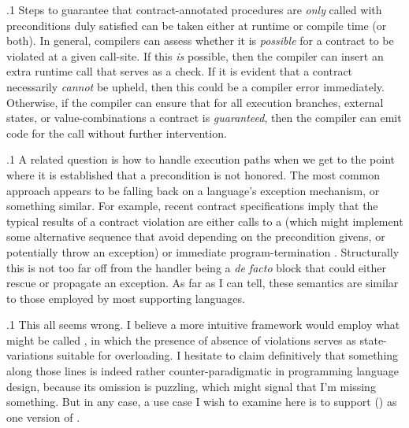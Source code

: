 \documentclass[11pt, twocolumn]{article}
\begin{document}
\p.1{%
Steps to guarantee that contract-annotated procedures
are \textit{only} called with preconditions duly satisfied
can be taken either at runtime or compile time (or both).
In general, compilers can assess whether it is \textit{possible}
for a contract to be violated at a given call-site.
If this \textit{is} possible, then the compiler can insert
an extra runtime call that serves as a 
check. If it is evident that a contract necessarily
\textit{cannot} be upheld, then this could be a compiler
error immediately. Otherwise, if the compiler
can ensure that for all execution branches, external states,
or value-combinations a contract is \textit{guaranteed}, then
the compiler can emit code for the call without further
intervention.
}%

\p.1{%
A related question is how to handle execution paths when
we get to the point where it is established that a precondition
is not honored. The most common approach appears to be
falling back on a language's exception mechanism, or something
similar. For example, recent  contract specifications
imply that the typical results of a contract violation
are either calls to a  (which might implement
some alternative sequence that avoid depending on the precondition
givens, or potentially throw an exception) or immediate
program-termination . Structurally this is not too far off
from the handler being a \textit{de facto}  block that
could either rescue or propagate an exception. As far as
I can tell, these semantics are similar to those
employed by most  supporting languages.
}%

\p.1{%
This all seems wrong. I believe a more intuitive
framework would employ what might be called ,
in which the presence of absence of violations serves as
state-variations suitable for overloading. I hesitate
to claim definitively that something along those lines
is indeed rather counter-paradigmatic in programming language
design, because its omission is puzzling, which might
signal that I'm missing something. But in any case, a
 use case I wish to examine here is to support 
() as one version of .
}%
\end{document}

